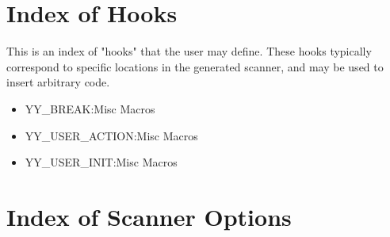\documentclass[openany,oneside]{book}
\begin{document}
\section{Index of Hooks}


This is an index of "hooks" that the user may define. These hooks typically  correspond
to specific locations in the generated scanner, and may be used to insert arbitrary code.
\begin{itemize}
\item YY\_{}BREAK:Misc Macros
\item YY\_{}USER\_{}ACTION:Misc Macros
\item YY\_{}USER\_{}INIT:Misc Macros
\end{itemize}

\section{Index of Scanner Options}
\end{document}
